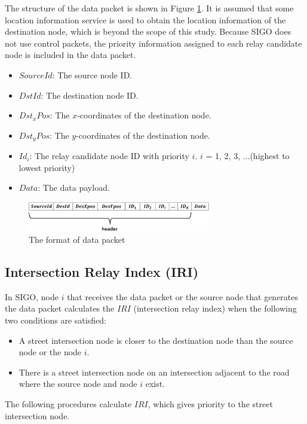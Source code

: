 \documentclass[conference]{IEEEtran}
\begin{document}
The structure of the data packet is shown in Figure \ref{fig:datapacket}. It is assumed that some location information service is used to obtain the location information of the destination node, which is beyond the scope of this study. 
Because SIGO does not use control packets, the priority information assigned to each relay candidate node is included in the data packet.

\begin{itemize}
\item $SourceId$: The source node ID.
\item $DstId$: The destination node ID.
\item $Dst_x Pos$: The $x$-coordinates of the destination node.
\item $Dst_y Pos$: The $y$-coordinates of the destination node.
\item $Id_i$: The relay candidate node ID with priority $i$. $i$ = 1, 2, 3, ...(highest to lowest priority) 
\item $Data$: The data payload.
\end{itemize}

\begin{figure}[!ht]
\centering
\includegraphics[width=80mm]{figures/data_packet_format.eps}
\caption{The format of data packet}
\label{fig:datapacket}
\end{figure}


\subsection{Intersection Relay Index (IRI)}

In SIGO, node $i$ that receives the data packet or the  source node that generates the data packet calculates the 
$IRI$ (intersection relay index) when the following two conditions are satisfied:
\begin{itemize}
\item A street intersection node is closer to the destination node than the source node or the node $i$.
\item There is a street intersection node on an intersection adjacent to the road where the source node and node $i$ exist.
\end{itemize}

The following procedures calculate $IRI$, which gives priority to  the street intersection node.
\end{document}
